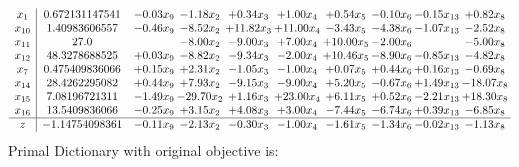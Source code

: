 \documentclass[9pt]{article}
\begin{document}
\[\begin{array}{c| c c@{\hskip 2pt} c@{\hskip 2pt} c@{\hskip 2pt} c@{\hskip 2pt} c@{\hskip 2pt} c@{\hskip 2pt} c@{\hskip 2pt} c@{\hskip 2pt} }
 x_{1}   &  0.672131147541 & -0.03 x_{9} & -1.18 x_{2} & +  0.34 x_{3} & +  1.00 x_{4} & +  0.54 x_{5} & -0.10 x_{6} & -0.15 x_{13} & +  0.82 x_{8}\\
 x_{10}   &  1.40983606557 & -0.46 x_{9} & -8.52 x_{2} & + 11.82 x_{3} & + 11.00 x_{4} & -3.43 x_{5} & -4.38 x_{6} & -1.07 x_{13} & -2.52 x_{8}\\
 x_{11}   &  27.0  &   & -8.00 x_{2} & -9.00 x_{3} & +  7.00 x_{4} & + 10.00 x_{5} & -2.00 x_{6} &   & -5.00 x_{8}\\
 x_{12}   &  48.3278688525 & +  0.03 x_{9} & -8.82 x_{2} & -9.34 x_{3} & -2.00 x_{4} & + 10.46 x_{5} & -8.90 x_{6} & -0.85 x_{13} & -4.82 x_{8}\\
 x_{7}   &  0.475409836066 & +  0.15 x_{9} & +  2.31 x_{2} & -1.05 x_{3} & -1.00 x_{4} & +  0.07 x_{5} & +  0.44 x_{6} & +  0.16 x_{13} & -0.69 x_{8}\\
 x_{14}   &  28.4262295082 & +  0.44 x_{9} & +  7.93 x_{2} & -9.15 x_{3} & -9.00 x_{4} & +  5.20 x_{5} & -0.67 x_{6} & +  1.49 x_{13} & -18.07 x_{8}\\
 x_{15}   &  7.08196721311 & -1.49 x_{9} & -29.70 x_{2} & +  1.16 x_{3} & + 23.00 x_{4} & +  6.11 x_{5} & +  0.52 x_{6} & -2.21 x_{13} & + 18.30 x_{8}\\
 x_{16}   &  13.5409836066 & -0.25 x_{9} & +  3.15 x_{2} & +  4.08 x_{3} & +  3.00 x_{4} & -7.44 x_{5} & -6.74 x_{6} & +  0.39 x_{13} & -6.85 x_{8}\\
\hline
z    &  -1.14754098361 & -0.11 x_{9} & -2.13 x_{2} & -0.30 x_{3} & -1.00 x_{4} & -1.61 x_{5} & -1.34 x_{6} & -0.02 x_{13} & -1.13 x_{8}\\
\end{array}\]
Primal Dictionary with original objective is:
\end{document}
